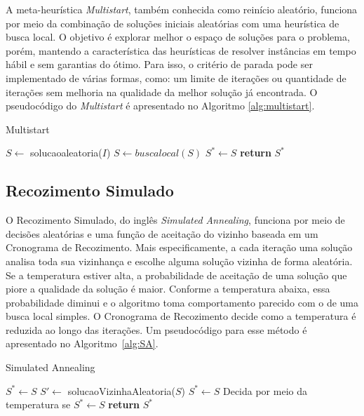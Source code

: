 \documentclass[12pt, a4paper]{article}
\begin{document}
A meta-heurística \textit{Multistart}, também conhecida como reinício aleatório, funciona por meio da combinação de soluções iniciais aleatórias com uma heurística de busca local. O objetivo é explorar melhor o espaço de soluções para o problema, porém, mantendo a característica das heurísticas de resolver instâncias em tempo hábil e sem garantias do ótimo. Para isso, o critério de parada pode ser implementado de várias formas, como: um limite de iterações ou quantidade de iterações sem melhoria na qualidade da melhor solução já encontrada. O pseudocódigo do \textit{Multistart} é apresentado no Algoritmo \ref{alg:multistart}.\par
%
\begin{algorithm}[htb!]
  \caption{Multistart}\label{alg:multistart}
  \begin{algorithmic}[1]
       \State $S \gets$ solucaoaleatoria($I$)
       \State $S \gets buscalocal(S)$ 
	      \State $S^* \gets S$
	  \EndIf
      \EndWhile
      \State \textbf{return} $S^*$
      \EndFunction
  \end{algorithmic}
\end{algorithm}

\subsection{Recozimento Simulado}

O Recozimento Simulado, do inglês \textit{Simulated Annealing}, funciona por meio de decisões aleatórias e uma função de aceitação do vizinho baseada em um Cronograma de Recozimento. Mais especificamente, a cada iteração uma solução analisa toda sua vizinhança e escolhe alguma solução vizinha de forma aleatória. Se a temperatura estiver alta, a probabilidade de aceitação de uma solução que piore a qualidade da solução é maior. Conforme a temperatura abaixa, essa probabilidade diminui e o algoritmo toma comportamento parecido com o de uma busca local simples. O Cronograma de Recozimento decide como a temperatura é reduzida ao longo das iterações. Um pseudocódigo para esse método é apresentado no Algoritmo~\ref{alg:SA}.
%
\begin{algorithm}[htb!]
  \caption{Simulated Annealing}\label{alg:SA}
  \begin{algorithmic}[1]
      \State $S^* \gets S$
       \State $S' \gets$ solucaoVizinhaAleatoria($S$)
	      \State $S^* \gets S$
	   \Else
		   	  \State Decida por meio da temperatura se $S^* \gets S$
	   	  \EndIf
	   \EndIf
      \EndWhile
      \State \textbf{return} $S^*$
      \EndFunction
  \end{algorithmic}
\end{algorithm}
\end{document}
